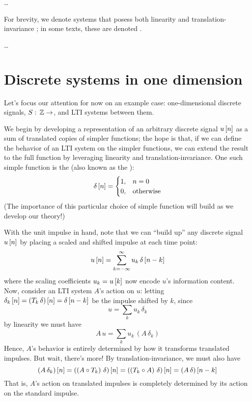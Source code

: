 \ldots

For brevity, we denote systems that posess both linearity and translation-invariance ; in some texts, these are denoted .

\ldots

\section{Discrete systems in one dimension}

Let's focus our attention for now on an example case: one-dimensional discrete signals, $\func{S}{\integers}$, and LTI systems between them.

We begin by developing a representation of an arbitrary discrete signal $u\left[ n \right]$ as a sum of translated copies of simpler functions; the hope is that, if we can define the behavior of an LTI system on the simpler functions, we can extend the result to the full function by leveraging linearity and translation-invariance. One such simple function is the  (also known as the ):
\[
\delta\left[ n \right] = 
\begin{cases}
    1, & n = 0 \\
    0, & \textrm{otherwise}
\end{cases}
\]
(The importance of this particular choice of simple function will build as we develop our theory!)

With the unit impulse in hand, note that we can ``build up'' any discrete signal $u\left[ n \right]$ by placing a scaled and shifted impulse at each time point:
\[ u\left[ n \right] = \sum_{k=-\infty}^{\infty} u_k \, \delta\left[ n - k \right] \]
where the scaling coefficients $u_k = u\left[ k \right]$ now encode $u$'s information content. Now, consider an LTI system $A$'s action on $u$: letting $\delta_k\left[ n \right] = \left(T_k \, \delta \right)\left[ n \right] = \delta\left[ n - k \right]$ be the impulse shifted by $k$, since
\[ u = \sum_k u_k \, \delta_k \]
by linearity we must have
\[ A \, u = \sum_k u_k \, \left(A \, \delta_k \right) \]
Hence, $A$'s behavior is entirely determined by how it transforms translated impulses. But wait, there's more! By translation-invariance, we must also have
\[ \left(A\,\delta_k\right)\left[ n \right] = \left( \left(A \circ T_k\right) \, \delta \right)\left[ n \right] = \left( \left(T_k \circ A\right) \, \delta \right)\left[ n \right] = \left(A\,\delta\right)\left[ n-k \right] \]
That is, $A$'s action on translated impulses is completely determined by its action on the standard impulse.

